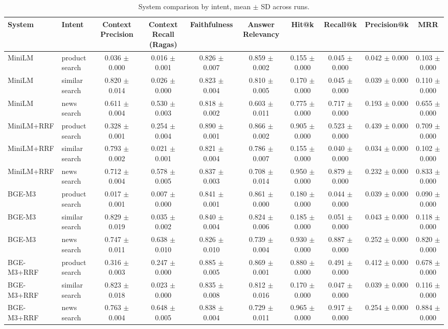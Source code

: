 \begin{table}[t]
\centering
\caption{System comparison by intent, mean $\pm$ SD across runs.}
\label{tab:systems-intent}
\begin{tabular}{llcccccccc}
\toprule
System & Intent & Context Precision & Context Recall (Ragas) & Faithfulness & Answer Relevancy & Hit@k & Recall@k & Precision@k & MRR \\
\midrule
MiniLM & product search & 0.036 $\pm$ 0.000 & 0.016 $\pm$ 0.001 & 0.826 $\pm$ 0.007 & 0.859 $\pm$ 0.002 & 0.155 $\pm$ 0.000 & 0.045 $\pm$ 0.000 & 0.042 $\pm$ 0.000 & 0.103 $\pm$ 0.000 \\
MiniLM & similar search & 0.820 $\pm$ 0.014 & 0.026 $\pm$ 0.000 & 0.823 $\pm$ 0.004 & 0.810 $\pm$ 0.005 & 0.170 $\pm$ 0.000 & 0.045 $\pm$ 0.000 & 0.039 $\pm$ 0.000 & 0.110 $\pm$ 0.000 \\
MiniLM & news search & 0.611 $\pm$ 0.004 & 0.530 $\pm$ 0.003 & 0.818 $\pm$ 0.002 & 0.603 $\pm$ 0.011 & 0.775 $\pm$ 0.000 & 0.717 $\pm$ 0.000 & 0.193 $\pm$ 0.000 & 0.655 $\pm$ 0.000 \\
MiniLM+RRF & product search & 0.328 $\pm$ 0.001 & 0.254 $\pm$ 0.004 & 0.890 $\pm$ 0.001 & 0.866 $\pm$ 0.002 & 0.905 $\pm$ 0.000 & 0.523 $\pm$ 0.000 & 0.439 $\pm$ 0.000 & 0.709 $\pm$ 0.000 \\
MiniLM+RRF & similar search & 0.793 $\pm$ 0.002 & 0.021 $\pm$ 0.001 & 0.821 $\pm$ 0.004 & 0.786 $\pm$ 0.007 & 0.155 $\pm$ 0.000 & 0.040 $\pm$ 0.000 & 0.034 $\pm$ 0.000 & 0.102 $\pm$ 0.000 \\
MiniLM+RRF & news search & 0.712 $\pm$ 0.004 & 0.578 $\pm$ 0.005 & 0.837 $\pm$ 0.003 & 0.708 $\pm$ 0.014 & 0.950 $\pm$ 0.000 & 0.879 $\pm$ 0.000 & 0.232 $\pm$ 0.000 & 0.833 $\pm$ 0.000 \\
BGE-M3 & product search & 0.017 $\pm$ 0.001 & 0.007 $\pm$ 0.000 & 0.841 $\pm$ 0.001 & 0.861 $\pm$ 0.000 & 0.180 $\pm$ 0.000 & 0.044 $\pm$ 0.000 & 0.039 $\pm$ 0.000 & 0.090 $\pm$ 0.000 \\
BGE-M3 & similar search & 0.829 $\pm$ 0.019 & 0.035 $\pm$ 0.002 & 0.840 $\pm$ 0.004 & 0.824 $\pm$ 0.006 & 0.185 $\pm$ 0.000 & 0.051 $\pm$ 0.000 & 0.043 $\pm$ 0.000 & 0.118 $\pm$ 0.000 \\
BGE-M3 & news search & 0.747 $\pm$ 0.011 & 0.638 $\pm$ 0.010 & 0.826 $\pm$ 0.010 & 0.739 $\pm$ 0.004 & 0.930 $\pm$ 0.000 & 0.887 $\pm$ 0.000 & 0.252 $\pm$ 0.000 & 0.820 $\pm$ 0.000 \\
BGE-M3+RRF & product search & 0.316 $\pm$ 0.003 & 0.247 $\pm$ 0.000 & 0.885 $\pm$ 0.005 & 0.869 $\pm$ 0.001 & 0.880 $\pm$ 0.000 & 0.491 $\pm$ 0.000 & 0.412 $\pm$ 0.000 & 0.678 $\pm$ 0.000 \\
BGE-M3+RRF & similar search & 0.823 $\pm$ 0.018 & 0.023 $\pm$ 0.000 & 0.835 $\pm$ 0.008 & 0.812 $\pm$ 0.016 & 0.170 $\pm$ 0.000 & 0.047 $\pm$ 0.000 & 0.039 $\pm$ 0.000 & 0.116 $\pm$ 0.000 \\
BGE-M3+RRF & news search & 0.763 $\pm$ 0.004 & 0.648 $\pm$ 0.005 & 0.838 $\pm$ 0.004 & 0.729 $\pm$ 0.011 & 0.965 $\pm$ 0.000 & 0.917 $\pm$ 0.000 & 0.254 $\pm$ 0.000 & 0.884 $\pm$ 0.000 \\
\bottomrule
\end{tabular}
\end{table}